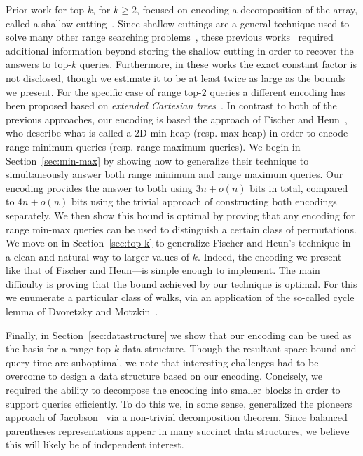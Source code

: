 \documentclass[runningheads]{llncs}
\begin{document}
Prior work for top-$k$, for $k \ge 2$, focused on encoding a
decomposition of the array, called a shallow
cutting~\cite{GINRS13,NRS14}.  Since shallow cuttings are a general
technique used to solve many other range searching
problems~\cite{M92,JL11}, these previous works~\cite{GINRS13,NRS14}
required additional information beyond storing the shallow cutting in
order to recover the answers to top-$k$ queries.  Furthermore, in
these works the exact constant factor is not disclosed, though we
estimate it to be at least twice as large as the bounds we
present. For the specific case of range top-$2$ queries a different
encoding has been proposed based on \emph{extended Cartesian
  trees}~\cite{PNRR14}.  In contrast to both of the previous
approaches, our encoding is based the approach of Fischer and
Heun~\cite{FH11}, who describe what is called a 2D min-heap
(resp. max-heap) in order to encode range minimum queries (resp. range
maximum queries).  We begin in Section~\ref{sec:min-max} by showing
how to generalize their technique to simultaneously answer both range
minimum and range maximum queries.  Our encoding provides the answer
to both using $3n +o(n)$ bits in total, compared to $4n +o(n)$ bits
using the trivial approach of constructing both encodings separately.
We then show this bound is optimal by proving that any encoding for
range min-max queries can be used to distinguish a certain class of
permutations.  We move on in Section~\ref{sec:top-k} to generalize
Fischer and Heun's technique in a clean and natural way to larger
values of $k$.  Indeed, the encoding we present---like that of Fischer
and Heun---is simple enough to implement.  The main difficulty is
proving that the bound achieved by our technique is optimal.  For this
we enumerate a particular class of walks, via an application of the
so-called cycle lemma of Dvoretzky and Motzkin~\cite{DM47}.

Finally, in Section~\ref{sec:datastructure} we show that our encoding
can be used as the basis for a range top-$k$ data structure.  Though
the resultant space bound and query time are suboptimal, we note that
interesting challenges had to be overcome to design a data structure
based on our encoding.  Concisely, we required the ability to
decompose the encoding into smaller blocks in order to support queries
efficiently.  To do this we, in some sense, generalized the pioneers
approach of Jacobson~\cite{J89} via a non-trivial decomposition
theorem.  Since balanced parentheses representations appear in many
succinct data structures, we believe this will likely be of
independent interest.
\end{document}
